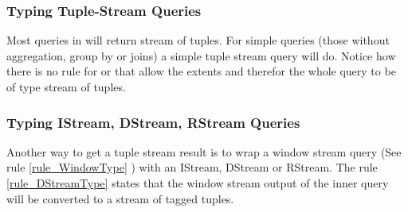 \subsubsection{Typing Tuple-Stream Queries}

Most queries in \SNEEql will return stream of tuples. 
For simple queries (those without aggregation, group by or joins) a simple tuple stream query will do.
Notice how there is no rule for  or  that allow the extents and therefor the whole query to be of type stream of tuples.


\subsubsection{Typing IStream, DStream, RStream Queries}
Another way to get a tuple stream result is to wrap a window stream query (See rule \ref{rule_WindowType}
) with an IStream, DStream or RStream.
The rule \ref{rule_DStreamType} states that the window stream output of the inner query will be converted to a stream of tagged tuples.


